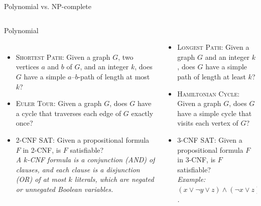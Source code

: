 \begin{frame}{Polynomial vs. NP-complete}

	\begin{columns}
		\begin{column}[t]{.48\textwidth}
			{\slides{\color{Green}\rule{\linewidth}{4pt}\\
					\hspace{1.8cm}} Polynomial\\
				\slides{\rule{\linewidth}{4pt}}\\}

			\begin{itemize}
				\item \textsc{Shortest Path}: Given a graph $G$, two vertices $a$ and $b$ of $G$, and an integer $k$, does $G$ have a simple $a$--$b$-path of length at most $k$?
				\item \textsc{Euler Tour}: Given a graph $G$, does $G$ have a cycle that traverses each edge of $G$ exactly once?
				\item \textsc{2-CNF SAT}: Given a propositional formula $F$ in 2-CNF, is $F$ satisfiable?\\\emph{A \alert{$k$-CNF formula} is a conjunction (AND) of clauses, and each clause is a disjunction (OR) of at most $k$ literals, which are negated or unnegated Boolean variables.}
			\end{itemize}
		\end{column}%
		\hfill%
		\begin{column}[t]{.48\textwidth}
			{\\}


			\begin{itemize}
				\item \textsc{Longest Path}: Given a graph $G$ and an integer $k$, does $G$ have a simple path of length at least $k$?
				\item \textsc{Hamiltonian Cycle}: Given a graph $G$, does $G$ have a simple cycle that visits each vertex of $G$?
				\item \textsc{3-CNF SAT}: Given a propositional formula $F$ in 3-CNF, is $F$ satisfiable?\\\emph{ Example: $(x \vee \neg y \vee z) \wedge (\neg x \vee z) \wedge (\neg y \vee \neg z)$.}
			\end{itemize}
		\end{column}%
	\end{columns}

\end{frame}



